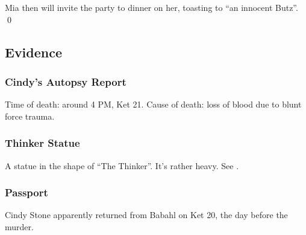 Mia then will invite the party to dinner on her, toasting to ``an innocent Butz''.
\qed

\subsection{Evidence}
\subsubsection{Cindy's Autopsy Report}
\label{evidence:cindyautopsy}
Time of death: around 4 PM, Ket 21. Cause of death: loss of blood due to blunt force trauma. 


\subsubsection{Thinker Statue}
\label{evidence:thinker}
A statue in the shape of ``The Thinker''. It's rather heavy. See .

\subsubsection{Passport}
\label{evidence:passport}
Cindy Stone apparently returned from Babahl on Ket 20, the day before the murder. 